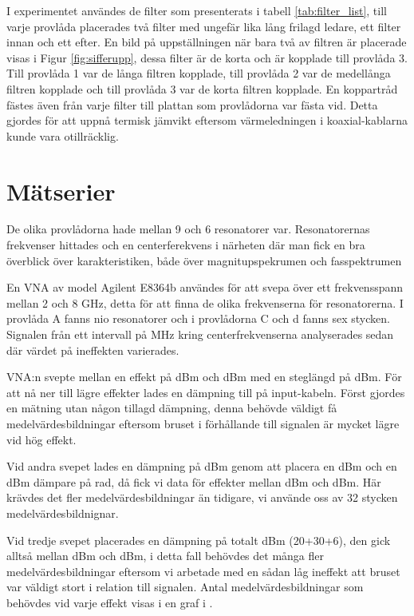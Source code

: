 \documentclass[main.tex]{subfiles}
\begin{document}
I experimentet användes de filter som presenterats i tabell \ref{tab:filter_list}, till varje provlåda placerades två filter med ungefär lika lång frilagd ledare, ett filter innan och ett efter. En bild på uppställningen när bara två av filtren är placerade visas i Figur \ref{fig:sifferupp}, dessa filter är de korta och är kopplade till provlåda 3. Till provlåda 1 var de långa filtren kopplade, till provlåda 2 var de medellånga filtren kopplade och till provlåda 3 var de korta filtren kopplade. En koppartråd fästes även från varje filter till plattan som provlådorna var fästa vid. Detta gjordes för att uppnå termisk jämvikt eftersom värmeledningen i koaxial-kablarna kunde vara otillräcklig. %


\section{Mätserier}


De olika provlådorna hade mellan 9 och 6 resonatorer var. Resonatorernas frekvenser hittades och en centerferekvens i närheten där man fick en bra överblick över karakteristiken, både över magnitupspekrumen och fasspektrumen 



En VNA av model Agilent E8364b användes för att svepa över ett frekvensspann mellan 2 och 8 GHz, detta för att finna de olika frekvenserna för resonatorerna. I provlåda A fanns nio resonatorer och i provlådorna C och d fanns sex stycken. Signalen från ett intervall på \unit[3]{MHz} kring centerfrekvenserna analyserades sedan där värdet på ineffekten varierades.


VNA:n svepte mellan en effekt på \unit[8]{dBm} och \unit[-27]{dBm} med en steglängd på \unit[2,5]{dBm}. För att nå ner till lägre effekter lades en dämpning till på input-kabeln. Först gjordes en mätning utan någon tillagd dämpning, denna behövde väldigt få medelvärdesbildningar eftersom bruset i förhållande till signalen är mycket lägre vid hög effekt. 

Vid andra svepet lades en dämpning på \unit[30]{dBm} genom att placera en \unit[20]{dBm} och en \unit[10]{dBm} dämpare på rad, då fick vi data för effekter mellan \unit[-22]{dBm} och \unit[-52]{dBm}. Här krävdes det fler medelvärdesbildningar än tidigare, vi använde oss av 32 stycken medelvärdesbildnignar. 

Vid tredje svepet placerades en dämpning på totalt \unit[56]{dBm} (20+30+6), den gick alltså mellan \unit[-44]{dBm} och \unit[-83]{dBm}, i detta fall behövdes det många fler medelvärdesbildningar eftersom vi arbetade med en sådan låg ineffekt att bruset var väldigt stort i relation till signalen. Antal medelvärdesbildningar som behövdes vid varje effekt visas i en graf i .
\end{document}
